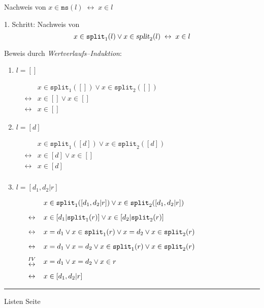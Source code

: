 \begin{slide}{}
\normalsize

\begin{center}
Nachweis von $x \in \texttt{ms}(l) \;\leftrightarrow\; x \in l$
\end{center}
\vspace*{0.5cm}

\footnotesize
1. Schritt: Nachweis von 
  $$x \in \texttt{split}_1(l) \vee x \in \textsl{split}_2(l) \;\leftrightarrow \; x \in l $$

Beweis durch \emph{Wertverlaufs--Induktion}:
\begin{enumerate}
\item $l= []$

      $
      \begin{array}{lcl}
        &                 & x \in \mathtt{split}_1([]) \vee x \in \mathtt{split}_2([]) \\[0.3cm]
        & \leftrightarrow & x \in [] \vee x \in [] \\[0.3cm]
        & \leftrightarrow & x \in []
      \end{array}
       $
\item $l = [d]$
    
      $
      \begin{array}{lcl}
 &                 & x \in \mathtt{split}_1([d]) \vee x \in \mathtt{split}_2([d]) \\
 & \leftrightarrow & x \in [d] \vee x \in [] \\
 & \leftrightarrow & x \in [d] \\
      \end{array}
      $
\item $l = [d_1, d_2 | r ]$

      $
      \begin{array}{lcl}
 &                 & x \in \mathtt{split}_1([d_1,d_2|r]) \vee x \in \mathtt{split}_2([d_1,d_2|r]) \\[0.3cm]
 & \leftrightarrow & x \in [ d_1 | \mathtt{split}_1(r) ] \vee x \in [ d_2 | \mathtt{split}_2(r) ] \\[0.3cm]
 & \leftrightarrow & x = d_1 \vee x \in \mathtt{split}_1(r) \vee x = d_2 \vee x \in \mathtt{split}_2(r) \\[0.3cm]
 & \leftrightarrow & x = d_1 \vee x = d_2 \vee x \in \mathtt{split}_1(r) \vee x \in \mathtt{split}_2(r) \\[0.3cm]
 & {IV \atop \displaystyle \leftrightarrow} & x = d_1 \vee x = d_2 \vee x \in r  \\[0.3cm]
 & \leftrightarrow & x \in [d_1, d_2 | r]  
      \end{array}
      $
      
\end{enumerate}


\vspace*{\fill}
\tiny \addtocounter{mypage}{1}
\rule{17cm}{1mm}
Listen  \hspace*{\fill} Seite 
\end{slide}

